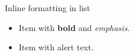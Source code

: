 \documentclass[14pt,t]{beamer-accessibility}
\begin{document}
\begin{frame}{Inline formatting in list}
\begin{itemize}
\item Item with \textbf{bold} and \emph{emphasis}.
\item Item with \alert{alert text}.
\end{itemize}
\end{frame}
\end{document}
